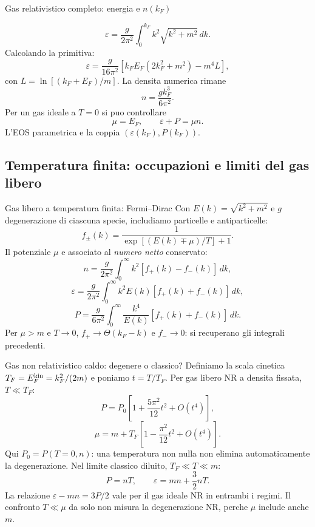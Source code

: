 \begin{frame}[t]{Gas relativistico completo: energia e $n(k_F)$}
\vspace*{3mm}
\small

\[
\varepsilon=\frac{g}{2\pi^2}\int_0^{k_F}k^2\sqrt{k^2+m^2}\,dk.
\]
Calcolando la primitiva:
\[
\boxed{\varepsilon=\frac{g}{16\pi^2}\left[k_FE_F(2k_F^2+m^2)-m^4L\right],}
\]
con $L=\ln[(k_F+E_F)/m]$.
La densita numerica rimane
\[
\boxed{n=\frac{gk_F^3}{6\pi^2}.}
\]
Per un gas ideale a $T=0$ si puo controllare
\[
\mu=E_F,\qquad \varepsilon+P=\mu n.
\]
L'EOS parametrica e la coppia $(\varepsilon(k_F),P(k_F))$.
\end{frame}

\subsection{Temperatura finita: occupazioni e limiti del gas libero}

\begin{frame}[t]{Gas libero a temperatura finita: Fermi--Dirac}
\vspace*{3mm}
\small
Con $E(k)=\sqrt{k^2+m^2}$ e $g$ degenerazione di ciascuna specie,
includiamo particelle e antiparticelle:
\[
f_\pm(k)=\frac1{\exp[(E(k)\mp\mu)/T]+1}.
\]
Il potenziale $\mu$ e associato al \emph{numero netto} conservato:
\[
n=\frac{g}{2\pi^2}\int_0^\infty k^2[f_+(k)-f_-(k)]\,dk,
\]
\[
\varepsilon=\frac{g}{2\pi^2}\int_0^\infty k^2 E(k)[f_+(k)+f_-(k)]\,dk,
\]
\[
P=\frac{g}{6\pi^2}\int_0^\infty\frac{k^4}{E(k)}[f_+(k)+f_-(k)]\,dk.
\]
Per $\mu>m$ e $T\to0$, $f_+\to\Theta(k_F-k)$ e $f_-\to0$:
si recuperano gli integrali precedenti.
\end{frame}

\begin{frame}[t]{Gas non relativistico caldo: degenere o classico?}
\vspace*{3mm}
\small
Definiamo la scala cinetica
$T_F=E_F^{\rm kin}=k_F^2/(2m)$ e poniamo $t=T/T_F$.
Per gas libero NR a densita fissata, $T\ll T_F$:
\[
P=P_0\left[1+\frac{5\pi^2}{12}t^2+O(t^4)\right],
\]
\[
\mu=m+T_F\left[1-\frac{\pi^2}{12}t^2+O(t^4)\right].
\]
Qui $P_0=P(T=0,n)$: una temperatura non nulla non elimina
automaticamente la degenerazione.
\smallskip
Nel limite classico diluito, $T_F\ll T\ll m$:
\[
\boxed{P=nT,\qquad \varepsilon=mn+\frac32 nT.}
\]
La relazione $\varepsilon-mn=3P/2$ vale per il gas ideale NR in entrambi
i regimi. Il confronto $T\ll\mu$ da solo non misura la degenerazione NR,
perche $\mu$ include anche $m$.
\end{frame}

